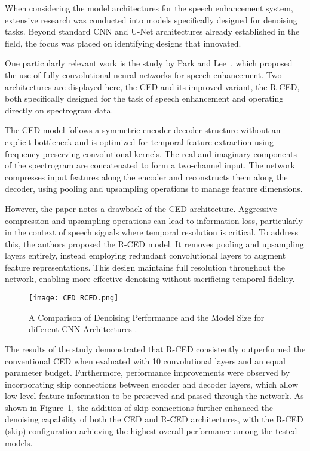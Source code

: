 When considering the model architectures for the speech enhancement system, extensive research was conducted into models specifically designed for denoising tasks. Beyond standard CNN and U-Net architectures already established in the field, the focus was placed on identifying designs that innovated.

One particularly relevant work is the study by Park and Lee~\cite{park2017acoustic}, which proposed the use of fully convolutional neural networks for speech enhancement. Two architectures are displayed here, the CED and its improved variant, the R-CED, both specifically designed for the task of speech enhancement and operating directly on spectrogram data.

The CED model follows a symmetric encoder-decoder structure without an explicit bottleneck and is optimized for temporal feature extraction using frequency-preserving convolutional kernels. The real and imaginary components of the spectrogram are concatenated to form a two-channel input. The network compresses input features along the encoder and reconstructs them along the decoder, using pooling and upsampling operations to manage feature dimensions.

However, the paper notes a drawback of the CED architecture. Aggressive compression and upsampling operations can lead to information loss, particularly in the context of speech signals where temporal resolution is critical. To address this, the authors proposed the R-CED model. It removes pooling and upsampling layers entirely, instead employing redundant convolutional layers to augment feature representations. This design maintains full resolution throughout the network, enabling more effective denoising without sacrificing temporal fidelity.

\begin{figure}[H]
    \centering
    \texttt{[image: CED\_RCED.png]}
    \caption{A Comparison of Denoising Performance and the
    Model Size for different CNN Architectures \cite{park2017acoustic}.}
    \label{fig:fcns_results}
\end{figure}

The results of the study demonstrated that R-CED consistently outperformed the conventional CED when evaluated with 10 convolutional layers and an equal parameter budget. Furthermore, performance improvements were observed by incorporating skip connections between encoder and decoder layers, which allow low-level feature information to be preserved and passed through the network. As shown in Figure~\ref{fig:fcns_results}, the addition of skip connections further enhanced the denoising capability of both the CED and R-CED architectures, with the R-CED (skip) configuration achieving the highest overall performance among the tested models.


